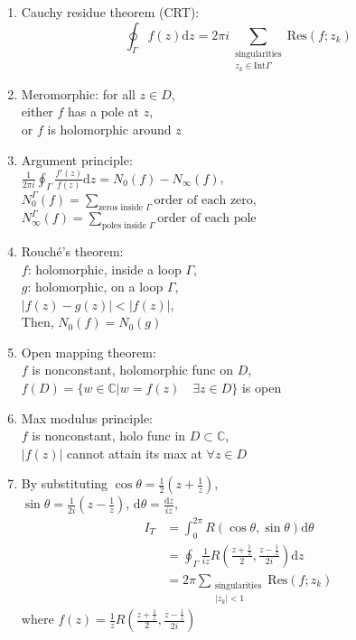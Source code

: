 \documentclass[11pt,a4paper]{article}
\begin{document}
\begin{multicols}{2}
\begin{enumerate}[resume]
\item Cauchy residue theorem (CRT): $$\oint_{\Gamma} f(z) \mathrm{d}z = 2 \pi i \sum_{\substack{\text{singularities} \\ z_k \in \mathrm{Int} \Gamma}} \mathrm{Res}(f;z_k)$$

\item Meromorphic: for all $z \in D$, \\either $f$ has a pole at $z$, \\or $f$ is holomorphic around $z$

\item Argument principle: \\$\displaystyle \frac{1}{2 \pi i} \oint_{\Gamma} \frac{f'(z)}{f(z)} \mathrm{d}z = N_0(f) - N_{\infty}(f)$, \\$N_0^{\Gamma}(f) = \sum_{\text{zeros inside }\Gamma} \text{order of each zero}$, \\$N_{\infty}^{\Gamma}(f) = \sum_{\text{poles inside }\Gamma} \text{order of each pole}$

\item Rouch\'e's theorem: \\$f$: holomorphic, inside a loop $\Gamma$, \\$g$: holomorphic, on a loop $\Gamma$, \\$|f(z) - g(z)| < |f(z)|$, \\Then, $N_0(f) = N_0(g)$

\item Open mapping theorem: \\$f$ is nonconstant, holomorphic func on $D$, \\$f(D) = \{ w \in \mathbb{C} | w = f(z) \quad \exists z \in D \}$ is open

\item Max modulus principle: \\$f$ is nonconstant, holo func in $D \subset \mathbb{C}$, \\$|f(z)|$ cannot attain its max at $\forall z \in D$

\item By substituting $\cos \theta = \frac{1}{2} \left( z + \frac{1}{z} \right)$, \\$\sin \theta = \frac{1}{2i} \left( z - \frac{1}{z} \right)$, $\mathrm{d}\theta = \frac{\mathrm{d}z}{iz}$, 
\begin{align*}
I_T &= \int_0^{2\pi} R(\cos \theta, \sin \theta) \mathrm{d}\theta \\
&= \oint_{\Gamma} \frac{1}{iz} R \left( \frac{z+\frac{1}{z}}{2}, \frac{z-\frac{1}{z}}{2i} \right) \mathrm{d}z \\
&= 2 \pi \sum_{\substack{\text{singularities} \\ |z_k| <1}} \mathrm{Res}(f;z_k)
\end{align*}
where $f(z) = \frac{1}{z} R \left( \frac{z+\frac{1}{z}}{2}, \frac{z-\frac{1}{z}}{2i} \right)$


\end{enumerate}
\end{multicols}
\end{document}
